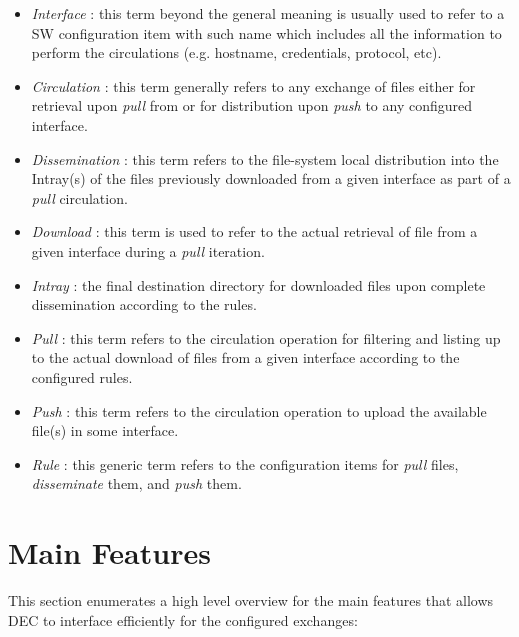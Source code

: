 \documentclass[dec_sum_main.tex]{subfiles}
\begin{document}
\begin{itemize}
	\item \textit{Interface} : this term beyond the general meaning is usually used to refer to a SW configuration item with such name which includes all the information to perform the circulations (e.g. hostname, credentials, protocol, etc).
	\item \textit{Circulation} : this term generally refers to any exchange of files either for retrieval upon \textit{pull} from or for distribution upon \textit{push} to any configured interface.
	\item \textit{Dissemination} : this term refers to the file-system local distribution into the Intray(s) of the files previously downloaded from a given interface as part of a \textit{pull} circulation.
	\item \textit{Download} : this term is used to refer to the actual retrieval of file from a given interface during a \textit{pull} iteration.
	\item \textit{Intray} : the final destination directory for downloaded files upon complete dissemination according to the rules.
	\item \textit{Pull} : this term refers to the circulation operation for filtering and listing up to the actual download of files from a given interface according to the configured rules. 
	\item \textit{Push} : this term refers to the circulation operation to upload the available file(s) in some interface. 
	\item \textit{Rule} : this generic term refers to the configuration items for \textit{pull} files, \textit{disseminate} them, and \textit{push} them.
\end{itemize}

\section{Main Features}
This section enumerates a high level overview for the main features that allows DEC to interface efficiently for the configured exchanges:
\end{document}
